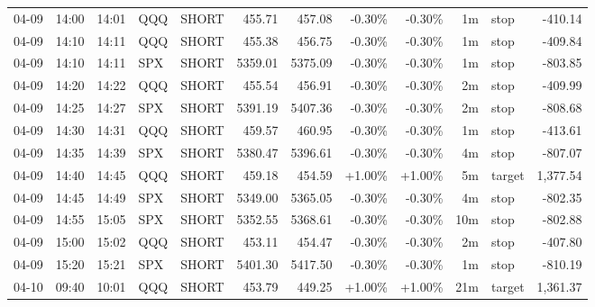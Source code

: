 \documentclass[11pt,a4paper]{article}
\begin{document}
\begin{center}
\begin{longtable}{>{\color{txtmain}}l l l l l r r r r r >{\color{txtmain}}l r}
04-09 & 14:00 & 14:01 & QQQ & SHORT & 455.71 & 457.08 & \textcolor{lossred}{-0.30\%} & \textcolor{lossred}{-0.30\%} & 1m & stop & \textcolor{lossred}{-410.14} \\
04-09 & 14:10 & 14:11 & QQQ & SHORT & 455.38 & 456.75 & \textcolor{lossred}{-0.30\%} & \textcolor{lossred}{-0.30\%} & 1m & stop & \textcolor{lossred}{-409.84} \\
04-09 & 14:10 & 14:11 & SPX & SHORT & 5359.01 & 5375.09 & \textcolor{lossred}{-0.30\%} & \textcolor{lossred}{-0.30\%} & 1m & stop & \textcolor{lossred}{-803.85} \\
04-09 & 14:20 & 14:22 & QQQ & SHORT & 455.54 & 456.91 & \textcolor{lossred}{-0.30\%} & \textcolor{lossred}{-0.30\%} & 2m & stop & \textcolor{lossred}{-409.99} \\
04-09 & 14:25 & 14:27 & SPX & SHORT & 5391.19 & 5407.36 & \textcolor{lossred}{-0.30\%} & \textcolor{lossred}{-0.30\%} & 2m & stop & \textcolor{lossred}{-808.68} \\
04-09 & 14:30 & 14:31 & QQQ & SHORT & 459.57 & 460.95 & \textcolor{lossred}{-0.30\%} & \textcolor{lossred}{-0.30\%} & 1m & stop & \textcolor{lossred}{-413.61} \\
04-09 & 14:35 & 14:39 & SPX & SHORT & 5380.47 & 5396.61 & \textcolor{lossred}{-0.30\%} & \textcolor{lossred}{-0.30\%} & 4m & stop & \textcolor{lossred}{-807.07} \\
04-09 & 14:40 & 14:45 & QQQ & SHORT & 459.18 & 454.59 & \textcolor{wingreen}{+1.00\%} & \textcolor{wingreen}{+1.00\%} & 5m & target & \textcolor{wingreen}{1,377.54} \\
04-09 & 14:45 & 14:49 & SPX & SHORT & 5349.00 & 5365.05 & \textcolor{lossred}{-0.30\%} & \textcolor{lossred}{-0.30\%} & 4m & stop & \textcolor{lossred}{-802.35} \\
04-09 & 14:55 & 15:05 & SPX & SHORT & 5352.55 & 5368.61 & \textcolor{lossred}{-0.30\%} & \textcolor{lossred}{-0.30\%} & 10m & stop & \textcolor{lossred}{-802.88} \\
04-09 & 15:00 & 15:02 & QQQ & SHORT & 453.11 & 454.47 & \textcolor{lossred}{-0.30\%} & \textcolor{lossred}{-0.30\%} & 2m & stop & \textcolor{lossred}{-407.80} \\
04-09 & 15:20 & 15:21 & SPX & SHORT & 5401.30 & 5417.50 & \textcolor{lossred}{-0.30\%} & \textcolor{lossred}{-0.30\%} & 1m & stop & \textcolor{lossred}{-810.19} \\
04-10 & 09:40 & 10:01 & QQQ & SHORT & 453.79 & 449.25 & \textcolor{wingreen}{+1.00\%} & \textcolor{wingreen}{+1.00\%} & 21m & target & \textcolor{wingreen}{1,361.37} \\

\end{longtable}
\end{center}
\end{document}
